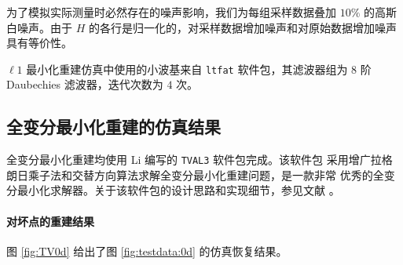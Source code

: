 为了模拟实际测量时必然存在的噪声影响，我们为每组采样数据叠加 $10\%$ 的高斯
白噪声。由于 $H$ 的各行是归一化的，对采样数据增加噪声和对原始数据增加噪声
具有等价性。

$\ell1$ 最小化重建仿真中使用的小波基来自 \verb|ltfat| 软件包，其滤波器组为
$8$ 阶 Daubechies 滤波器，迭代次数为 $4$ 次\cite{ltfatnote015}。 
\cite{ltfatnote030}

\subsection{全变分最小化重建的仿真结果}

全变分最小化重建均使用 Li 编写的 \verb|TVAL3| 软件包完成。该软件包
采用增广拉格朗日乘子法和交替方向算法求解全变分最小化重建问题，是一款非常
优秀的全变分最小化求解器。关于该软件包的设计思路和实现细节，参见文献
\cite{TVAL3CBLMaster} \cite{TVAL3CBLPhD}。

\paragraph{对坏点的重建结果} 图 \ref{fig:TV0d} 给出了图 
\ref{fig:testdata:0d} 的仿真恢复结果。

